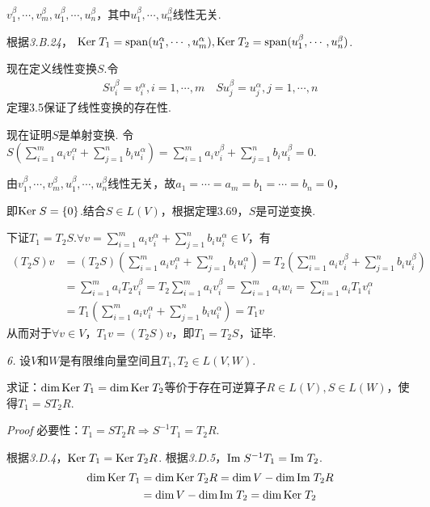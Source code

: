 \(v_1^\beta,\cdots,v_m^\beta,u_1^\beta,\cdots,u_n^\beta\)，其中\(u_1^\beta,\cdots,u_n^\beta\)线性无关.

根据\textit{3.B.24}，
\(\mathrm{Ker \;} T_1=\mathrm{span} (u_1^\alpha,\cdots,u_m^\alpha),\mathrm{Ker \;} T_2=\mathrm{span} (u_1^\beta,\cdots,u_n^\beta)\).

现在定义线性变换\(S\).令
    \begin{align*}
        Sv_i^\beta=v_i^\alpha,i=1,\cdots,m \quad
        Su_j^\beta=u_j^\alpha,j=1,\cdots,n
    \end{align*}
定理3.5保证了线性变换的存在性.

现在证明\(S\)是单射变换.
令\(S(\sum_{i=1}^m a_iv_i^\alpha+\sum_{j=1}^n b_iu_i^\alpha)=\sum_{i=1}^m a_iv_i^\beta+\sum_{j=1}^n b_iu_i^\beta=0\).

由\(v_1^\beta,\cdots,v_m^\beta,u_1^\beta,\cdots,u_n^\beta\)线性无关，故\(a_1=\cdots=a_m=b_1=\cdots=b_n=0\)，

即\(\mathrm{Ker \;} S=\{0\}\).结合\(S \in L(V)\)，根据定理3.69，\(S\)是可逆变换.

下证\(T_1=T_2S\).\(\forall v=\sum_{i=1}^m a_iv_i^\alpha+\sum_{j=1}^n b_iu_i^\alpha \in V\)，有
    \begin{align*}
        (T_2S)v&=(T_2S)(\sum_{i=1}^m a_iv_i^\alpha+\sum_{j=1}^n b_iu_i^\alpha )
                =T_2(\sum_{i=1}^m a_iv_i^\beta+\sum_{j=1}^n b_iu_i^\beta ) \\
               &=\sum_{i=1}^m a_iT_2v_i^\beta=T_2\sum_{i=1}^m a_iv_i^\beta
                =\sum_{i=1}^m a_iw_i=\sum_{i=1}^m a_iT_1v_i^\alpha \\
               &=T_1(\sum_{i=1}^m a_iv_i^\alpha+\sum_{j=1}^n b_iu_i^\alpha)=T_1v
    \end{align*}
从而对于\(\forall v \in V\)，\(T_1v=(T_2S)v\)，即\(T_1=T_2S\)，证毕.

\newpage

\textit{6.}
设\(V\)和\(W\)是有限维向量空间且\(T_1,T_2 \in L(V,W)\).

求证：\(\dim \mathrm{Ker \;} T_1=\dim \mathrm{Ker \;} T_2\)等价于存在可逆算子\(R \in L(V),S \in L(W)\)，使得\(T_1=ST_2R\).

\textit{Proof}
必要性：\(T_1=ST_2R \Rightarrow S^{-1}T_1=T_2R\).

根据\textit{3.D.4}，\(\mathrm{Ker \;} T_1=\mathrm{Ker \;} T_2R\).
根据\textit{3.D.5}，\(\mathrm{Im \;} S^{-1}T_1=\mathrm{Im \;} T_2\).
    \begin{align*}
        \dim \mathrm{Ker \;} T_1 &=\dim \mathrm{Ker \;} T_2R=\dim V-\dim \mathrm{Im \;} T_2R \\
        &=\dim V-\dim \mathrm{Im \;} T_2=\dim \mathrm{Ker \;} T_2
    \end{align*}

